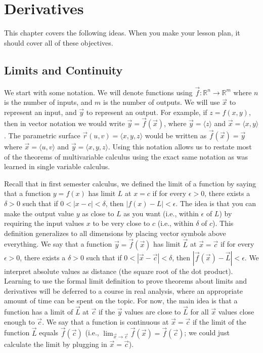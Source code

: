 
\chapter{Derivatives}

This chapter covers the following ideas.  When you make your lesson
plan, it should cover all of these objectives.





\section{Limits and Continuity}
We start with some notation.  We will denote functions using $\vec f\colon
\mathbb{R}^n\to\mathbb{R}^m$ where $n$ is the number of inputs, and $m$
is the number of outputs.  We will use $\vec x$ to represent an input,
and $\vec y$ to represent an output.  For example, if $z=f(x,y)$, then
in vector notation we would write $\vec y=\vec f(\vec x)$, where $\vec
y=\langle z\rangle$ and $\vec x = \langle x,y\rangle$.  The parametric
surface $\vec r(u,v)=\langle x,y,z\rangle$ would be written as $\vec
f(\vec x)=\vec y$ where $\vec x = \langle u,v\rangle$ and $\vec
y=\langle x,y,z\rangle$.  Using this notation allows us to restate most
of the theorems of multivariable calculus using the exact same
notation as was learned in single variable calculus.

Recall that in first semester calculus, we defined the limit of a
function by saying that a function $y=f(x)$ has limit $L$ at $x=c$ if
for every $\epsilon>0$, there exists a $\delta>0$ such that if $0<|x-c|<\delta$, then
$|f(x)-L|<\epsilon$. The idea is that you can make the output value $y$ as
close to $L$ as you want (i.e., within $\epsilon$ of $L$) by requiring the
input values $x$ to be very close to $c$ (i.e., within $\delta$ of $c$).
This definition generalizes to all dimensions by placing vector
symbols above everything.  We say that a function $\vec y=\vec f(\vec
x)$ has limit $\vec L$ at $\vec x=\vec c$ if for every $\epsilon>0$, there
exists a $\delta>0$ such that if $0<|\vec x-\vec c|<\delta$, then $|\vec f(\vec
x)-\vec L|<\epsilon$. We interpret absolute values as distance (the square
root of the dot product). Learning to use the formal limit definition
to prove theorems about limits and derivatives will be deferred to a
course in real analysis, where an appropriate amount of time can be
spent on the topic. For now, the main idea is that a function has a
limit of $\vec L$ at $\vec c$ if the $\vec y$ values are close to
$\vec L$ for all $\vec x$ values close enough to $\vec c$.  We say
that a function is continuous at $\vec x=\vec c$ if the limit of the
function $\vec L$ equals $\vec f(\vec c)$ (i.e., $\lim_{\vec x \to \vec
  c}\vec f(\vec x)=\vec f(\vec c)$; we could just calculate the limit
by plugging in $\vec x=\vec c$).

